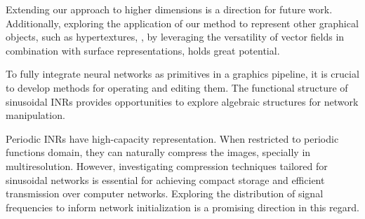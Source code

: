 

Extending our approach to higher dimensions is a direction for future work. Additionally, exploring the application of our method to represent other graphical objects, such as hypertextures, \citet{hypertexture}, by leveraging the versatility of vector fields in combination with surface representations, holds great potential.


To fully integrate neural networks as primitives in a graphics pipeline, it is crucial to develop methods for operating and editing them. The functional structure of sinusoidal INRs provides opportunities to explore algebraic structures for network manipulation. 


Periodic INRs have high-capacity representation. When restricted to periodic functions domain, they can naturally compress the images, specially in multiresolution. However, investigating compression techniques tailored for sinusoidal networks is essential for achieving compact storage and efficient transmission over computer networks. Exploring the distribution of signal frequencies to inform network initialization is a promising direction in this regard.




